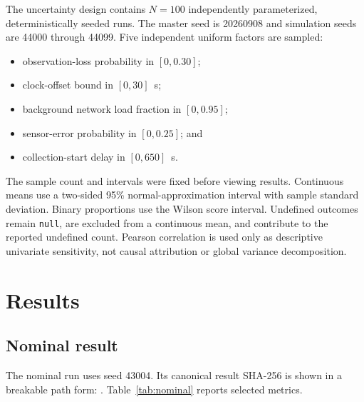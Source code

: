 ﻿\documentclass[11pt,a4paper]{article}
\newcommand{\code}[1]{\texttt{#1}}
\begin{document}
The uncertainty design contains $N=100$ independently parameterized, deterministically seeded runs. The master seed is 20260908 and simulation seeds are 44000 through 44099. Five independent uniform factors are sampled:

\begin{itemize}
  \item observation-loss probability in $[0,0.30]$;
  \item clock-offset bound in $[0,30]$~s;
  \item background network load fraction in $[0,0.95]$;
  \item sensor-error probability in $[0,0.25]$; and
  \item collection-start delay in $[0,650]$~s.
\end{itemize}

The sample count and intervals were fixed before viewing results. Continuous means use a two-sided 95\% normal-approximation interval with sample standard deviation. Binary proportions use the Wilson score interval. Undefined outcomes remain \code{null}, are excluded from a continuous mean, and contribute to the reported undefined count. Pearson correlation is used only as descriptive univariate sensitivity, not causal attribution or global variance decomposition.

\section{Results}

\subsection{Nominal result}

The nominal run uses seed 43004. Its canonical result SHA-256 is shown in a breakable path form:
.
Table~\ref{tab:nominal} reports selected metrics.
\end{document}
